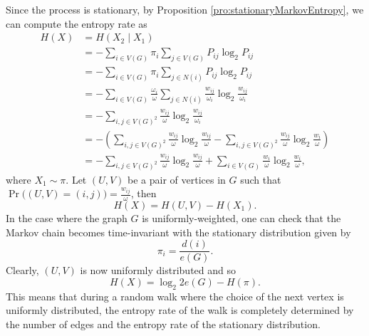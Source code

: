 \documentclass[math, code]{amznotes}
\theoremstyle{remark}
\begin{document}
Since the process is stationary, by Proposition \ref{pro:stationaryMarkovEntropy}, we can compute the entropy rate as 
\begin{align*}
    H\left(X\right) & = H\left(X_2 \mid X_1\right) \\
    & = -\sum_{i \in V\left(G\right)}\pi_i\sum_{j \in V\left(G\right)}P_{ij}\log_2P_{ij} \\
    & = -\sum_{i \in V\left(G\right)}\pi_i\sum_{j \in N\left(i\right)}P_{ij}\log_2P_{ij} \\
    & = -\sum_{i \in V\left(G\right)}\frac{\omega_i}{\omega}\sum_{j \in N\left(i\right)}\frac{w_{ij}}{\omega_i}\log_2\frac{w_{ij}}{\omega_i} \\
    & = -\sum_{i, j \in V\left(G\right)^2}\frac{w_{ij}}{\omega}\log_2\frac{w_{ij}}{\omega_i} \\
    & = -\left(\sum_{i, j \in V\left(G\right)^2}\frac{w_{ij}}{\omega}\log_2\frac{w_{ij}}{\omega} - \sum_{i, j \in V\left(G\right)^2}\frac{w_{ij}}{\omega}\log_2\frac{w_{i}}{\omega}\right) \\
    & = -\sum_{i, j \in V\left(G\right)^2}\frac{w_{ij}}{\omega}\log_2\frac{w_{ij}}{\omega} + \sum_{i \in V\left(G\right)}\frac{w_{i}}{\omega}\log_2\frac{w_{i}}{\omega},
\end{align*}
where $X_1 \sim \pi$. Let $\left(U, V\right)$ be a pair of vertices in $G$ such that $\Pr\bigl(\left(U, V\right) = \left(i, j\right)\bigr) = \frac{w_{ij}}{\omega}$, then 
\begin{equation*}
    H\left(X\right) = H\left(U, V\right) - H\left(X_1\right).
\end{equation*}
In the case where the graph $G$ is uniformly-weighted, one can check that the Markov chain becomes time-invariant with the stationary distribution given by 
\begin{equation*}
    \pi_i = \frac{d\left(i\right)}{e\left(G\right)}.
\end{equation*}
Clearly, $\left(U, V\right)$ is now uniformly distributed and so 
\begin{equation*}
    H\left(X\right) = \log_2{2e\left(G\right)} - H\left(\pi\right).
\end{equation*}
This means that during a random walk where the choice of the next vertex is uniformly distributed, the entropy rate of the walk is completely determined by the number of edges and the entropy rate of the stationary distribution.
\end{document}

